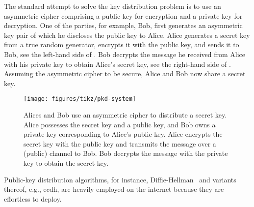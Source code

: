 The standard attempt to solve the key distribution problem is to use an asymmetric cipher comprising a public key for encryption and a private key for decryption.
One of the parties, for example, Bob, first generates an asymmetric key pair of which he discloses the public key to Alice.
Alice generates a secret key from a true random generator, encrypts it with the public key, and sends it to Bob, see the left-hand side of .
Bob decrypts the message he received from Alice with his private key to obtain Alice's secret key, see the right-hand side of .
Assuming the asymmetric cipher to be secure, Alice and Bob now share a secret key.
\begin{figure}[htb]
	\centering
	\texttt{[image: figures/tikz/pkd-system]}
	\caption{Alices and Bob use an asymmetric cipher to distribute a secret key. Alice possesses the secret key and a public key, and Bob owns a private key corresponding to Alice's public key. Alice encrypts the secret key with the public key and transmits the message over a (public) channel to Bob. Bob decrypts the message with the private key to obtain the secret key.}\label{fig:pkd_system}
\end{figure}
Public-key distribution algorithms, for instance, Diffie-Hellman~\cite{Diffie1976} and variants thereof, e.g., \gls{ecdh}, are heavily employed on the internet because they are effortless to deploy.

